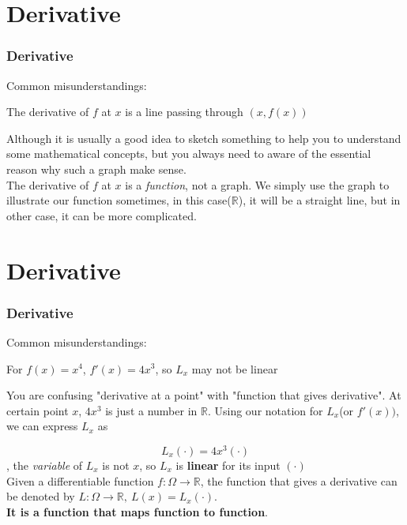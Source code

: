 \documentclass[12pt, t]{beamer}
\renewcommand{\emph}[1]{{\color{Turquoise3}\textsl{#1}}}
\begin{document}
\section{Derivative}
\begin{frame}
    \frametitle{Derivative}
Common misunderstandings:\\
\vspace{0.5em}
    \begin{center}
        The derivative of $f$ at $x$ is a line passing through $(x,f(x))$
    \end{center}
\vspace{0.5em}

\hspace{1em} Although it is usually a good idea to sketch something to help you to understand some mathematical concepts, but you always need to 
aware of the essential reason why such a graph make sense.\\
\vspace{1em}
\hspace{1em} The derivative of $f$ at $x$ is a \emph{function}, not a graph. We simply use the graph to illustrate our function sometimes, in 
this case($\mathbb{R}$), it will be a straight line, but in other case, it can be more complicated.


\hspace{1em} 

\end{frame}

\section{Derivative}
\begin{frame}
    \frametitle{Derivative}

    Common misunderstandings:\\
\vspace{0.5em}
    \begin{center}
        For $f(x)=x^4$, $f'(x)=4x^3$, so $L_x$ may not be linear
    \end{center}
\vspace{0.5em}

\hspace{1em} You are confusing "derivative at a point" with "function that gives derivative".
At certain point $x$, $4x^3$ is just a number in $\mathbb{R}$. Using our notation for $L_x$(or $f'(x))$, we 
can express $L_x$ as 

\begin{equation*}
    L_x(\cdot)=4x^3(\cdot)
\end{equation*}
, the \emph{variable} of $L_x$ is not $x$, so $L_x$ is \textbf{linear} for its input $(\cdot)$\\
\vspace{1em}
Given a differentiable function $f:\Omega\rightarrow\mathbb{R}$, the function 
that gives a derivative can be denoted by $L:\Omega\rightarrow\mathbb{R},\ L(x)=L_x(\cdot)$.\\
\textbf{It is a function that maps function to function}.

    
\end{frame}
\end{document}
